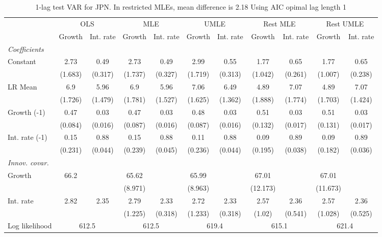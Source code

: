 \begin{table}[htbp] 
	\centering
	\begin{tabular}{@{\extracolsep{4pt}}lcccccccccc@{}}		\hline\hline
		 		 & \multicolumn{2}{c}{OLS} &\multicolumn{2}{c}{MLE} &\multicolumn{2}{c}{UMLE} &\multicolumn{2}{c}{Rest MLE} &\multicolumn{2}{c}{Rest UMLE} \\ 
 		 & Growth 	 & Int. rate 	 & Growth 	 & Int. rate 	 & Growth 	 & Int. rate 	 & Growth 	 & Int. rate 	 & Growth 	 & Int. rate\\\cline{2-3}\cline{4-5}\cline{6-7}\cline{8-9}\cline{10-11}
\rule{0pt}{4ex} 
 \emph{Coefficients} 	  		 & 		 & 		 & 		 & 		 & 		 & 		 & 		 & 		 & 		 &\\ 
\quad Constant 	 & 2.73 	 & 0.49 	 & 2.73 	 & 0.49 	 & 2.99 	 & 0.55 	 & 1.77 	 & 0.65 	 & 1.77 	 & 0.65	 \\ 
 		 & (1.683) 	 & (0.317) 	 & (1.737) 	 & (0.327) 	 & (1.719) 	 & (0.313) 	 & (1.042) 	 & (0.261) 	 & (1.007) 	 & (0.238) 	 \\ 
\quad LR Mean 	 & 6.9 	 & 5.96 	 & 6.9 	 & 5.96 	 & 7.06 	 & 6.49 	 & 4.89 	 & 7.07 	 & 4.89 	 & 7.07	 \\ 
 		 & (1.726) 	 & (1.479) 	 & (1.781) 	 & (1.527) 	 & (1.625) 	 & (1.362) 	 & (1.888) 	 & (1.774) 	 & (1.703) 	 & (1.424) 	 \\ 
\quad Growth (-1) 	 &0.47 	 & 0.03 	 & 0.47 	 & 0.03 	 & 0.48 	 & 0.03 	 & 0.51 	 & 0.03 	 & 0.51 	 & 0.03	 \\ 
 		 & (0.084) 	 & (0.016) 	 & (0.087) 	 & (0.016) 	 & (0.087) 	 & (0.016) 	 & (0.132) 	 & (0.017) 	 & (0.131) 	 & (0.017) 	 \\ 
\quad Int. rate (-1) 	 &0.15 	 & 0.88 	 & 0.15 	 & 0.88 	 & 0.11 	 & 0.88 	 & 0.09 	 & 0.89 	 & 0.09 	 & 0.89	 \\ 
 		 & (0.231) 	 & (0.044) 	 & (0.239) 	 & (0.045) 	 & (0.236) 	 & (0.044) 	 & (0.195) 	 & (0.038) 	 & (0.182) 	 & (0.036) 	 \\ 
\rule{0pt}{4ex} \emph{Innov. covar.}  	 & 	 & 	 & 	 & 	 & 	 & 	 & 	 & 	 & 	 &\\ 
\quad Growth 	 &66.2 	 &  	 & 65.62 	 &  	 & 65.99 	 &  	 & 67.01 	 &  	 & 67.01 	 & 	 \\ 
 		 &  	 &  	 & (8.971) 	 &  	 & (8.963) 	 &  	 & (12.173) 	 &  	 & (11.673) 	 &  	 \\ 
\quad Int. rate 	 &2.82 	 & 2.35 	 & 2.79 	 & 2.33 	 & 2.72 	 & 2.33 	 & 2.57 	 & 2.36 	 & 2.57 	 & 2.36	 \\ 
 		 &  	 &  	 & (1.225) 	 & (0.318) 	 & (1.233) 	 & (0.318) 	 & (1.02) 	 & (0.541) 	 & (1.028) 	 & (0.525) 	 \\ 
 \hline \rule{0pt}{4ex} 
  Log likelihood 	 &\multicolumn{2}{c}{612.5} 	 & \multicolumn{2}{c}{612.5} 	 & \multicolumn{2}{c}{619.4} 	 & \multicolumn{2}{c}{615.1} 	 & \multicolumn{2}{c}{621.4}\\ 

 \hline 	\end{tabular}		\caption{1-lag test VAR for JPN. In restricted MLEs, mean difference is 2.18 Using AIC opimal lag length 1}
		\label{tab:JPNopt_}

\end{table}